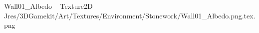 
   Wall01_Albedo             	   Texture2D
   J   res/3DGamekit/Art/Textures/Environment/Stonework/Wall01_Albedo.png.tex.png